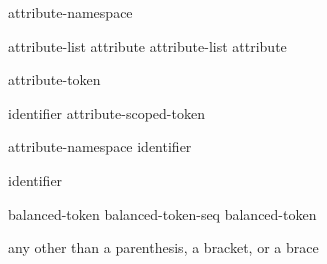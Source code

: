 \begin{bnf}
\br
   attribute-namespace \terminal{:}
\end{bnf}

\begin{bnf}
\br
  \br
  attribute-list \terminal{,} \br
  attribute \br
  attribute-list \terminal{,} attribute 
\end{bnf}

\begin{bnf}
\br
    attribute-token 
\end{bnf}

\begin{bnf}
\br
    identifier\br
    attribute-scoped-token
\end{bnf}

\begin{bnf}
\br
    attribute-namespace \terminal{::} identifier
\end{bnf}

\begin{bnf}
\br
    identifier
\end{bnf}

\begin{bnf}
\br
    \terminal{(}  \terminal{)}
\end{bnf}

\begin{bnf}
\br
    balanced-token\br
    balanced-token-seq balanced-token
\end{bnf}

\begin{bnf}
\br
    \terminal{(}  \terminal{)}\br
    \terminal{[}  \terminal{]}\br
    \terminal{\{}  \terminal{\}}\br
    \textnormal{any  other than a parenthesis, a bracket, or a brace}
\end{bnf}

